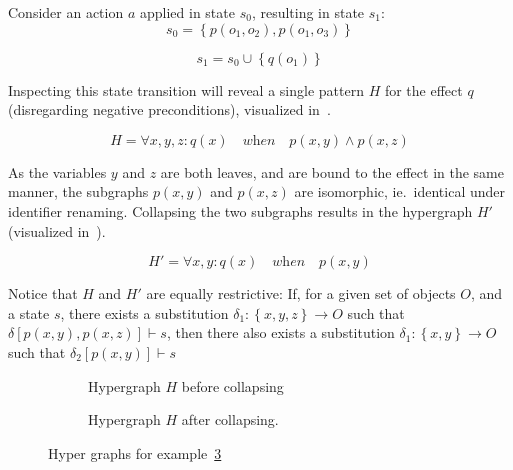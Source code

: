 \documentclass[../Master.tex]{subfiles}
\providecommand{\master}{..}
\begin{document}
\begin{example}\label{ex:ca:hgma:ex:collapsing}

	Consider an action $a$ applied in state $s_0$, resulting in state $s_1$:
	\begin{equation*}
		s_0 = \left\{ 
			p\left(o_1, o_2\right), p\left(o_1, o_3\right)
		\right\}
	\end{equation*}

	\begin{equation*}
		s_1 = s_0 \cup \left\{
			q\left( o_1 \right)
		\right\}
	\end{equation*}

	Inspecting this state transition will reveal a single pattern $H$ for the effect $q$ (disregarding negative preconditions), visualized in~.

    \begin{equation*}
        H = \forall x, y, z : q(x) \quad \textit{when} \quad
            p(x,y) \land p(x,z)
    \end{equation*}

	As the variables $y$ and $z$ are both leaves, and are bound to the effect in the same manner, the subgraphs $p(x,y)$ and $p(x,z)$ are isomorphic, ie.\ identical under identifier renaming. Collapsing the two subgraphs results in the hypergraph $H'$ (visualized in~).
	
    \begin{equation*}
        H' = \forall x, y : q(x) \quad \textit{when} \quad p(x,y)
    \end{equation*}

	Notice that $H$ and $H'$ are equally restrictive: If, for a given set of objects $O$, and a state $s$, there exists a substitution $\delta_1 : \left\{x, y, z\right\} \rightarrow O$ such that $\delta\left[p(x,y), p(x,z)\right] \vdash s$, then there also exists a substitution $\delta_1 : \left\{x, y\right\} \rightarrow O$ such that $\delta_2\left[p(x,y)\right] \vdash s$

	\begin{figure}
        \centering
        \hfill
        \begin{subfigure}[b]{0.4\textwidth}
            \centering
            \resizebox{0.7\linewidth}{!}{}
            \caption{Hypergraph $H$ before collapsing}
            \label{fig:ex:ca:hgma:ex:isomorphic}
        \end{subfigure}%
        \hfill%
        \begin{subfigure}[b]{0.4\textwidth}
            \centering
            \resizebox{0.75\linewidth}{!}{}
            \caption{Hypergraph $H$ after collapsing.}
            \label{fig:ex:ca:hgma:ex:isomorphicReduced}
        \end{subfigure}
		\caption{Hyper graphs for example~\ref{fig:ex:ca:hgma:ex:collapsing}}\label{fig:ex:ca:hgma:ex:collapsing}
        \hfill
    \end{figure}
\end{example}
\end{document}
